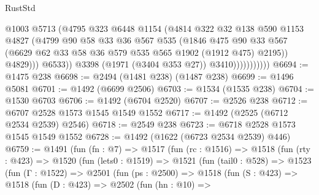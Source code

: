 \begin{lexlean}{RustStd}
\begin{coremodule}
{\begin{coremodule}
{{{{{{{{{{{{{                              @1003
                              @5713
                              (@4795
                                @323
                                @6448
                                @1154
                                (@4814
                                  @322
                                  @32
                                  @138
                                  @590
                                  @1153
                                  @4827
                                  (@4799
                                    @90
                                    @58
                                    @33
                                    @36
                                    @567
                                    @535
                                    (@1846
                                      @475
                                      @90
                                      @33
                                      @567
                                      (@6629
                                        @62
                                        @33
                                        @58
                                        @36
                                        @579
                                        @535
                                        @565
                                        @1902
                                        (@1912 @475)
                                        @2195))
                                    @4829)))
                              @6533))
                          @3398
                          (@1971 (@3404 @353 @27))
                          @3410)))))))))))
@6694 := @1475 @238
@6698 := @2494 (@1481 @238) (@1487 @238)
@6699 := @1496 @5081
@6701 := @1492 (@6699 @2506)
@6703 := @1534 (@1535 @238)
@6704 := @1530 @6703
@6706 := @1492 (@6704 @2520)
@6707 := @2526 @238
@6712 := @6707 @2528 @1573 @1545 @1549 @1552
@6717 := @1492 (@2525 (@6712 @2534 @2539) @2546)
@6718 := @2549 @238
@6723 := @6718 @2528 @1573 @1545 @1549 @1552
@6728 := @1492 (@1622 (@6723 @2534 @2539) @446)
@6759 := @1491
    (fun (fn : @7) =>
    @1517
      (fun (rc : @1516) =>
      @1518
        (fun (rty : @423) =>
        @1520
          (fun (lets0 : @1519) =>
          @1521
            (fun (tail0 : @528) =>
            @1523
              (fun (Γ : @1522) =>
              @2501
                (fun (ps : @2500) =>
                @1518
                  (fun (S : @423) =>
                  @1518
                    (fun (D : @423) =>
                    @2502
                      (fun (hn : @10) =>
}}}}}}}}}}}}}
\end{coremodule}}
\end{coremodule}
\end{lexlean}
